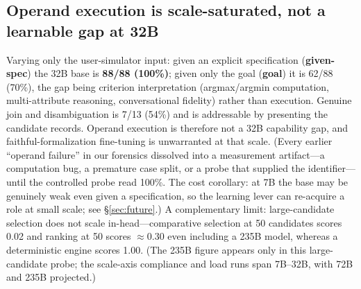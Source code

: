 \documentclass[10pt]{article}
\begin{document}
\subsection{Operand execution is scale-saturated, not a learnable gap at 32B}\label{sec:operand}
Varying only the user-simulator input: given an explicit specification (\textbf{given-spec}) the 32B base is \textbf{88/88 (100\%)}; given only the goal (\textbf{goal}) it is 62/88 (70\%), the gap being criterion interpretation (argmax/argmin computation, multi-attribute reasoning, conversational fidelity) rather than execution. Genuine join and disambiguation is 7/13 (54\%) and is addressable by presenting the candidate records. Operand execution is therefore not a 32B capability gap, and faithful-formalization fine-tuning is unwarranted at that scale. (Every earlier ``operand failure'' in our forensics dissolved into a measurement artifact---a computation bug, a premature case split, or a probe that supplied the identifier---until the controlled probe read 100\%. The cost corollary: at 7B the base may be genuinely weak even given a specification, so the learning lever can re-acquire a role at small scale; see \S\ref{sec:future}.) A complementary limit: large-candidate selection does not scale in-head---comparative selection at 50 candidates scores 0.02 and ranking at 50 scores $\approx0.30$ even including a 235B model, whereas a deterministic engine scores 1.00. (The 235B figure appears only in this large-candidate probe; the scale-axis compliance and load runs span 7B--32B, with 72B and 235B projected.)
\end{document}
